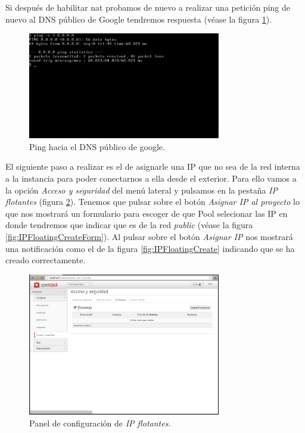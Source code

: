 \documentclass{article}
\begin{document}
	Si después de habilitar nat probamos de nuevo a realizar una petición ping de nuevo al DNS público de Google tendremos respuesta (véase la figura \ref{fig:InstanceConsolePingGoogle}).

\begin{figure}[h]
  \centering
    \includegraphics[width=0.75\textwidth]{img/m_047.png}
  \caption{Ping hacia el DNS público de google.}
  \label{fig:InstanceConsolePingGoogle}
\end{figure}	

	El siguiente paso a realizar es el de asignarle una IP que no sea de la red interna a la instancia para poder conectarnos a ella desde el exterior. Para ello vamos a la opción \emph{Acceso y seguridad} del menú lateral y pulsamos en la pestaña \emph{IP flotantes} (figura \ref{fig:IPFloatingInit}). Tenemos que pulsar sobre el botón \emph{Asignar IP al proyecto} lo que nos mostrará un formulario para escoger de que Pool selecionar las IP en donde tendremos que indicar que es de la red \emph{public} (véase la figura \ref{fig:IPFloatingCreateForm}). Al pulsar sobre el botón \emph{Asignar IP} nos mostrará una notificación como el de la figura \ref{fig:IPFloatingCreate} indicando que se ha creado correctamente.

\begin{figure}[h]
  \centering
    \includegraphics[width=0.75\textwidth]{img/m_048.png}
  \caption{Panel de configuración de \emph{IP flotantes}.}
  \label{fig:IPFloatingInit}
\end{figure}	
\end{document}
